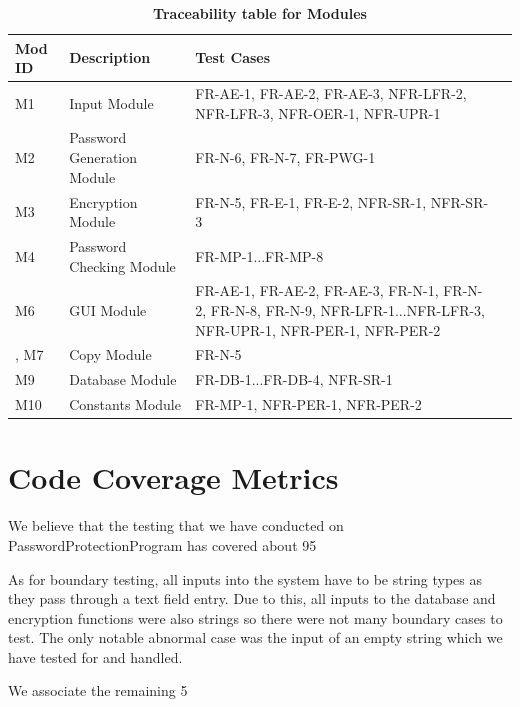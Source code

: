 \documentclass[12pt, titlepage]{article}
\begin{document}
\begin{table}[!htbp]
    \caption{\textbf{Traceability table for Modules}} \label{Table}
    \begin{tabularx}{\textwidth}{p{2cm}Xp{2cm}X}
        \toprule
        \textbf{Mod ID} & \textbf{Description} & \textbf{Test Cases}\\
        \midrule
        M1  & Input Module & FR-AE-1, FR-AE-2, FR-AE-3, NFR-LFR-2, NFR-LFR-3, NFR-OER-1, NFR-UPR-1\\\hline
        M2  & Password Generation Module & FR-N-6, FR-N-7, FR-PWG-1\\\hline
        M3  & Encryption Module & FR-N-5, FR-E-1, FR-E-2, NFR-SR-1, NFR-SR-3\\\hline
        M4  & Password Checking Module & FR-MP-1...FR-MP-8 \\\hline
        M6  & GUI Module & FR-AE-1, FR-AE-2, FR-AE-3, FR-N-1, FR-N-2, FR-N-8, FR-N-9, NFR-LFR-1...NFR-LFR-3, NFR-UPR-1, NFR-PER-1, NFR-PER-2\\\hline, 
        M7  & Copy Module & FR-N-5\\\hline
        M9  & Database Module & FR-DB-1...FR-DB-4, NFR-SR-1\\\hline
        M10 & Constants Module & FR-MP-1, NFR-PER-1, NFR-PER-2\\\hline
    
        \bottomrule
    \end{tabularx}
\end{table}



\section{Code Coverage Metrics}

We believe that the testing that we have conducted on PasswordProtectionProgram has covered about 95%

As for boundary testing, all inputs into the system have to be string types as they pass through a text field entry. Due to this, all inputs to the database and encryption functions were also strings so there were not many boundary cases to test. The only notable abnormal case was the input of an empty string which we have tested for and handled.

We associate the remaining 5%




\end{document}
